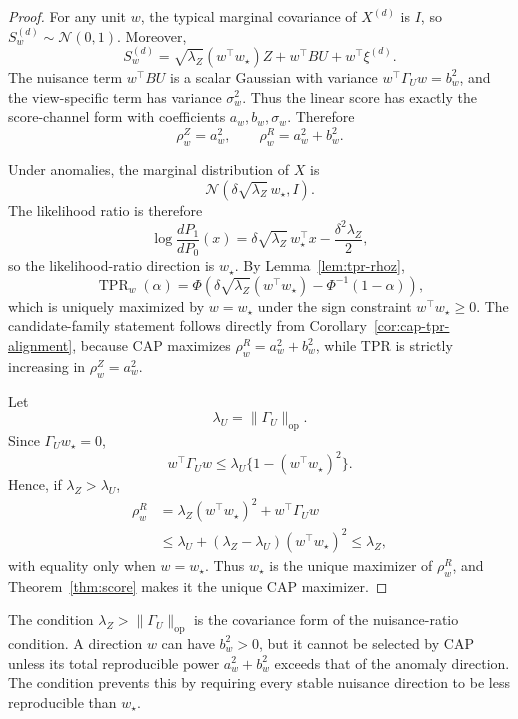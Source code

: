 \documentclass[11pt]{article}
\newcommand{\Normal}{\mathcal{N}}
\newcommand{\TPR}{\operatorname{TPR}}
\begin{document}
\begin{proof}
For any unit \(w\), the typical marginal covariance of \(X^{(d)}\) is \(I\), so
\(S_w^{(d)}\sim\Normal(0,1)\). Moreover,
\[
    S_w^{(d)}
    =
    \sqrt{\lambda_Z}(w^\top w_\star) Z
    +
    w^\top B U
    +
    w^\top \xi^{(d)}.
\]
The nuisance term \(w^\top B U\) is a scalar Gaussian with variance
\(w^\top\Gamma_Uw=b_w^2\), and the view-specific term has variance
\(\sigma_w^2\). Thus the linear score has exactly the score-channel form with
coefficients \(a_w,b_w,\sigma_w\). Therefore
\[
    \rho_w^Z=a_w^2,
    \qquad
    \rho_w^R=a_w^2+b_w^2.
\]

Under anomalies, the marginal distribution of \(X\) is
\[
    \Normal(\delta\sqrt{\lambda_Z}\,w_\star,I).
\]
The likelihood ratio is therefore
\[
    \log\frac{dP_1}{dP_0}(x)
    =
    \delta\sqrt{\lambda_Z}\,w_\star^\top x
    -
    \frac{\delta^2\lambda_Z}{2},
\]
so the likelihood-ratio direction is \(w_\star\). By
Lemma~\ref{lem:tpr-rhoz},
\[
    \TPR_w(\alpha)
    =
    \Phi\!\left(
        \delta\sqrt{\lambda_Z}(w^\top w_\star)
        -
        \Phi^{-1}(1-\alpha)
    \right),
\]
which is uniquely maximized by \(w=w_\star\) under the sign constraint
\(w^\top w_\star\ge0\). The candidate-family statement follows directly from
Corollary~\ref{cor:cap-tpr-alignment}, because CAP maximizes
\(\rho_w^R=a_w^2+b_w^2\), while TPR is strictly increasing in
\(\rho_w^Z=a_w^2\).

Let
\[
    \lambda_U=\|\Gamma_U\|_{\mathrm{op}}.
\]
Since \(\Gamma_Uw_\star=0\),
\[
    w^\top\Gamma_Uw
    \le
    \lambda_U\{1-(w^\top w_\star)^2\}.
\]
Hence, if \(\lambda_Z>\lambda_U\),
\[
\begin{aligned}
    \rho_w^R
    &=
    \lambda_Z(w^\top w_\star)^2
    +
    w^\top\Gamma_Uw  \\
    &\le
    \lambda_U
    +
    (\lambda_Z-\lambda_U)(w^\top w_\star)^2
    \le
    \lambda_Z,
\end{aligned}
\]
with equality only when \(w=w_\star\). Thus \(w_\star\) is the unique maximizer
of \(\rho_w^R\), and Theorem~\ref{thm:score} makes it the unique CAP maximizer.
\end{proof}

The condition \(\lambda_Z>\|\Gamma_U\|_{\mathrm{op}}\) is the covariance form of
the nuisance-ratio condition. A direction \(w\) can have \(b_w^2>0\), but it
cannot be selected by CAP unless its total reproducible power
\(a_w^2+b_w^2\) exceeds that of the anomaly direction. The condition prevents
this by requiring every stable nuisance direction to be less reproducible than
\(w_\star\).
\end{document}
